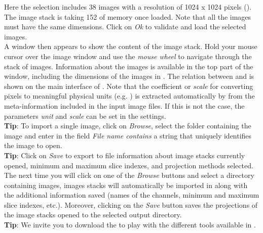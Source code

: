 Here the selection includes 38 images with a resolution of 1024 x 1024 pixels (\px). The image stack is taking 152 \MB of memory once loaded. Note that all the images must have the same dimensions. Click on \textit{Ok} to validate and load the selected images.\\

A window then appears to show the content of the image stack. Hold your mouse cursor over the image window and use the \emph{mouse wheel} to navigate through the stack of images. Information about the images is available in the top part of the window, including the dimensions of the images in \mum. The relation between \px and \mum is shown on the main interface of \wingj. Note that the coefficient or \emph{scale} for converting pixels to meaningful physical units (e.g. \mum) is extracted automatically by \wingj from the meta-information included in the input image files. If this is not the case, the parameters \textit{unit} and \textit{scale} can be set in the settings.\\

\textbf{Tip}: To import a single image, click on \textit{Browse}, select the folder containing the image and enter in the field \textit{File name contains} a string that uniquely identifies the image to open.\\

\textbf{Tip}: Click on \textit{Save} to export to file information about image stacks currently opened, minimum and maximum slice indexes, and projection methods selected. The next time you will click on one of the \textit{Browse} buttons and select a directory containing images, images stacks will automatically be imported in \wingj along with the additional information saved (names of the channels, minimum and maximum slice indexes, etc.). Moreover, clicking on the \emph{Save} button saves the projections of the image stacks opened to the selected output directory.\\

\textbf{Tip}: We invite you to download the \wingjBenchmarkImages to play with the different tools available in \wingj.